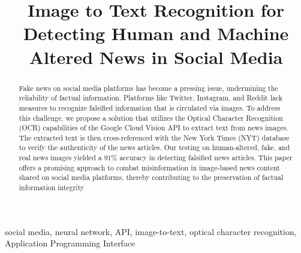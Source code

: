 \documentclass[conference]{IEEEtran}
\begin{document}
\title{Image to Text Recognition for Detecting Human and Machine Altered News in Social Media
} 
\author{
\and
{}
\and
{}
\and
{}
\and
{}
\and
{}
}
\maketitle

\begin{abstract}
Fake news on social media platforms has become a pressing issue, undermining the reliability of factual information. Platforms like Twitter, Instagram, and Reddit lack measures to recognize falsified information that is circulated via images. To address this challenge, we propose a solution that utilizes the Optical Character Recognition (OCR) capabilities of the Google Cloud Vision API to extract text from news images. The extracted text is then cross-referenced with the New York Times (NYT) database to verify the authenticity of the news articles. Our testing on human-altered, fake, and real news images yielded a 91\% accuracy in detecting falsified news articles. This paper offers a promising approach to combat misinformation in image-based news content shared on social media platforms, thereby contributing to the preservation of factual information integrity
\end{abstract}
\begin{IEEEkeywords}
social media, neural network, API, image-to-text, optical character recognition, Application Programming Interface
\end{IEEEkeywords}
\end{document}
